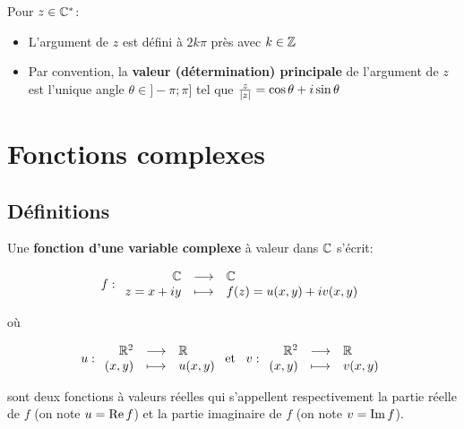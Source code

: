 \begin{remark}
    Pour $z \in \mathbb{C}^*$:
    \begin{itemize}
        \item 
        L'argument de $z$ est défini à $2k\pi$ près avec $k \in \mathbb{Z}$
        \item 
        Par convention, la \textbf{valeur (détermination) principale} de l'argument de $z$ est l'unique angle $\theta \in ] -\pi ; \pi ]$ tel que $\frac{z}{\left|z\right|} = \cos \theta + i \sin \theta$
    \end{itemize}
\end{remark}


\section{Fonctions complexes}

\subsection{Définitions}

\begin{definition}
    Une \textbf{fonction d'une variable complexe} à valeur dans $\mathbb{C}$ s'écrit:
    
    \[
    f: \begin{array}{{rcl}}
    \C & \longrightarrow & \C \\
    z = x+iy & \longmapsto & f(z) = u(x,y) + i v(x,y) \\
    \end{array}
    \]
    
    où
    
    \[
    u: \begin{array}{{rcl}}
    \R^2 & \longrightarrow & \R \\
    (x,y) & \longmapsto & u(x,y) \\
    \end{array}
    \textrm{ et }\enspace
    v: \begin{array}{{rcl}}
    \R^2 & \longrightarrow & \R \\
    (x,y) & \longmapsto & v(x,y) \\
    \end{array}
    \]
    
    sont deux fonctions à valeurs réelles qui s'appellent respectivement la partie réelle de $f$ (on note $u = \operatorname{Re} f$) et la partie imaginaire de $f$ (on note $v = \operatorname{Im} f$).
\end{definition}

